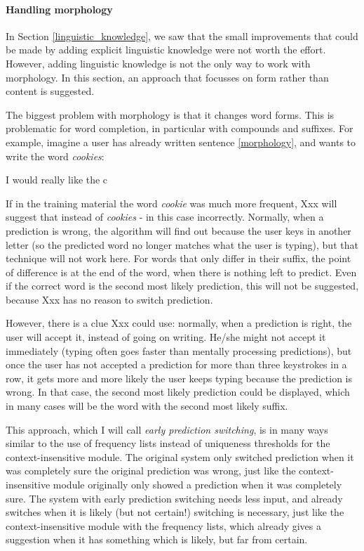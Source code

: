 \documentclass[11pt]{article}
\begin{document}
\paragraph{Handling morphology} \label{early}
In Section \ref{linguistic_knowledge}, we saw that the small improvements that could be made by adding explicit linguistic knowledge were not worth the effort. However, adding linguistic knowledge is not the only way to work with morphology. In this section, an approach that focusses on form rather than content is suggested.

The biggest problem with morphology is that it changes word forms. This is problematic for word completion, in particular with compounds and suffixes. For example, imagine a user has already written sentence \ref{morphology}, and wants to write the word \emph{cookies}:

\begin{examples}
\item I would really like the c \label{morphology}
\end{examples}

If in the training material the word \emph{cookie} was much more frequent, Xxx will suggest that instead of \emph{cookies} - in this case incorrectly. Normally, when a prediction is wrong, the algorithm will find out because the user keys in another letter (so the predicted word no longer matches what the user is typing), but that technique will not work here. For words that only differ in their suffix, the point of difference is at the end of the word, when there is nothing left to predict. Even if the correct word is the second most likely prediction, this will not be suggested, because Xxx has no reason to switch prediction.

However, there is a clue Xxx could use: normally, when a prediction is right, the user will accept it, instead of going on writing. He/she might not accept it immediately (typing often goes faster than mentally processing predictions), but once the user has not accepted a prediction for more than three keystrokes in a row, it gets more and more likely the user keeps typing because the prediction is wrong. In that case, the second most likely prediction could be displayed, which in many cases will be the word with the second most likely suffix.

This approach, which I will call \emph{early prediction switching}, is in many ways similar to the use of frequency lists instead of uniqueness thresholds for the context-insensitive module. The original system only switched prediction when it was completely sure the original prediction was wrong, just like the context-insensitive module originally only showed a prediction when it was completely sure. The system with early prediction switching needs less input, and already switches when it is likely (but not certain!) switching is necessary, just like the context-insensitive module with the frequency lists, which already gives a suggestion when it has something which is likely, but far from certain.
\end{document}
